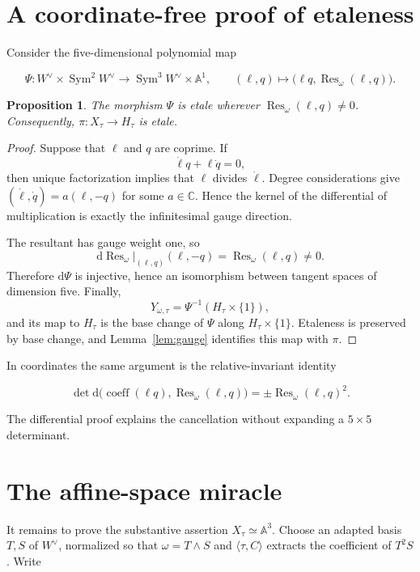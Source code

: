 \documentclass[11pt,a4paper]{article}
\newtheorem{proposition}[theorem]{Proposition}
\theoremstyle{remark}
\DeclareMathOperator{\Sym}{Sym}
\DeclareMathOperator{\Res}{Res}
\newcommand{\A}{\mathbb A}
\newcommand{\C}{\mathbb C}
\newcommand{\dd}{\mathrm d}
\begin{document}
\section{A coordinate-free proof of etaleness}

Consider the five-dimensional polynomial map

\[
  \Psi\colon W^\vee\times\Sym^2W^\vee
  \longrightarrow\Sym^3W^\vee\times\A^1,
  \qquad
  (\ell,q)\longmapsto
  \bigl(\ell q,\Res_\omega(\ell,q)\bigr).
\]

\begin{proposition}\label{prop:etale}
The morphism $\Psi$ is etale wherever $\Res_\omega(\ell,q)\ne0$.
Consequently, $\pi\colon X_\tau\to H_\tau$ is etale.
\end{proposition}

\begin{proof}
Suppose that $\ell$ and $q$ are coprime.  If
\[
  \dot\ell q+\ell\dot q=0,
\]
then unique factorization implies that $\ell$ divides $\dot\ell$.
Degree considerations give
$(\dot\ell,\dot q)=a(\ell,-q)$ for some $a\in\C$.  Hence the kernel of the
differential of multiplication is exactly the infinitesimal gauge direction.

The resultant has gauge weight one, so
\[
  \dd\Res_\omega\big|_{(\ell,q)}(\ell,-q)
  =\Res_\omega(\ell,q)\ne0.
\]
Therefore $\dd\Psi$ is injective, hence an isomorphism between tangent spaces
of dimension five.  Finally,
\[
  Y_{\omega,\tau}
  =\Psi^{-1}(H_\tau\times\{1\}),
\]
and its map to $H_\tau$ is the base change of $\Psi$ along
$H_\tau\times\{1\}$.  Etaleness is preserved by base change, and
Lemma~\ref{lem:gauge} identifies this map with $\pi$.
\end{proof}

In coordinates the same argument is the relative-invariant identity

\[
  \det \dd\bigl(\operatorname{coeff}(\ell q),
  \Res_\omega(\ell,q)\bigr)
  =\pm\Res_\omega(\ell,q)^2.
\]

The differential proof explains the cancellation without expanding a
$5\times5$ determinant.

\section{The affine-space miracle}\label{sec:affine-chart}

It remains to prove the substantive assertion $X_\tau\simeq\A^3$.  Choose an
adapted basis $T,S$ of $W^\vee$, normalized so that
$\omega=T\wedge S$ and $\langle\tau,C\rangle$ extracts the coefficient of
$T^2S$.  Write
\end{document}

